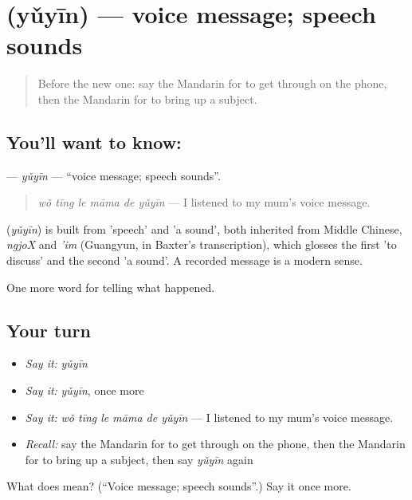 \section[\texorpdfstring{\zh{语音} (yǔyīn)}{语音 (yǔyīn)}]{ (yǔyīn) — voice message; speech sounds}

\label{lesson:ZH-C320-yuyin}



\begin{quote}
Before the new one: say the Mandarin for to get through on the phone, then the Mandarin for to bring up a subject.
\end{quote}

\subsection*{You'll want to know: }
\textbf{} — \emph{yǔyīn} — \textquotedblleft{}voice message; speech sounds\textquotedblright{}.

\begin{quote}
\emph{wǒ tīng le māma de yǔyīn} — I listened to my mum's voice message.
\end{quote}

\begin{cousinweb}
\textbf{} (\emph{yǔyīn}) is built from  'speech' and  'a sound', both inherited from Middle Chinese, \emph{ngjoX} and \emph{'im} (Guangyun, in Baxter's transcription), which glosses the first 'to discuss' and the second 'a sound'. A recorded message is a modern sense.
\end{cousinweb}

\begin{grammarlens}[title={What you've built}]
One more word for telling what happened.
\end{grammarlens}

\subsection*{Your turn}
\begin{itemize}
\raggedright
  \item \emph{Say it:} \emph{yǔyīn}
  \item \emph{Say it:} \emph{yǔyīn}, once more
  \item \emph{Say it:} \emph{wǒ tīng le māma de yǔyīn} — I listened to my mum's voice message.
  \item \emph{Recall:} say the Mandarin for to get through on the phone, then the Mandarin for to bring up a subject, then say \emph{yǔyīn} again
\end{itemize}

\begin{tcolorbox}[breakable,colback=teal!4,colframe=teal!35!black,title={Before you move on}]
What does  mean? (\textquotedblleft{}Voice message; speech sounds\textquotedblright{}.) Say it once more.
\end{tcolorbox}
